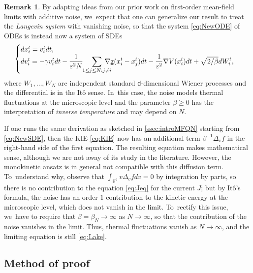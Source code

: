 \documentclass[JEP,XML,SOM,Unicode,published]{cedram}
\theoremstyle{plain}
\theoremstyle{definition}
\newtheorem{remark}[thm]{Remark}
\newcommand{\R}{{\mathbb{R}}}
\let\be\beta
\let\ga\gamma
\let\vep\varepsilon
\renewcommand{\d}{\mathsf{d}}
\newcommand{\g}{{\mathsf{g}}}
\begin{document}
\begin{remark}
By adapting ideas from our prior work \cite{RS2021} on first-order mean-field limits with additive noise, we~expect that one can generalize our result to treat the \emph{Langevin system} with vanishing noise, so that the system \eqref{eq:NewODE} of ODEs is instead now a system of SDEs
\begin{equation}\label{eq:NewSDE}
\begin{cases}
d{x}_i^t = v_i^tdt, \\
d{v}_i^t = -\ga v_i^tdt \displaystyle-\frac{1}{\vep^2 N}\hspace*{-1mm} \sum_{1\leq j\leq N: j\neq i}\hspace*{-4mm}\nabla\g(x_i^t-x_j^t)dt -\frac{1}{\vep^2}\nabla V(x_i^t)dt + \sqrt{2/\be}dW_i^t,
\end{cases}
\end{equation}
where $W_1,\ldots,W_N$ are independent standard $\d$-dimensional Wiener processes and the differential is in the Itô sense. In~this case, the noise models thermal fluctuations at the microscopic level and the parameter $\be\geq 0$ has the interpretation of \emph{inverse temperature} and may depend on $N$.

If one runs the same derivation as sketched in \cref{ssec:introMFQN} starting from \eqref{eq:NewSDE}, then the KIE \eqref{eq:KIE} now has an additional term $\be^{-1} \Delta_v f$ in the right-hand side of the first equation. The resulting equation makes mathematical sense, although we are not away of its study in the literature. However, the monokinetic ansatz is in general not compatible with this diffusion term. To~understand why, observe that $\int_{\R^\d}v\Delta_v f dv = 0$ by integration by parts, so there is no contribution to the equation \eqref{eq:Jeq} for the current $J$; but by Itô's formula, the noise has an order $1$ contribution to the kinetic energy at the microscopic level, which does not vanish in the limit. To~rectify this issue, we~have to require that $\be=\be_N \to\infty$ as $N\to\infty$, so that the contribution of the noise vanishes in the limit. Thus, thermal fluctuations vanish as $N\to\infty$, and the limiting equation is still \eqref{eq:Lake}.\end{remark}

\subsection{Method of proof}\label{ssec:introMPf}
\end{document}

